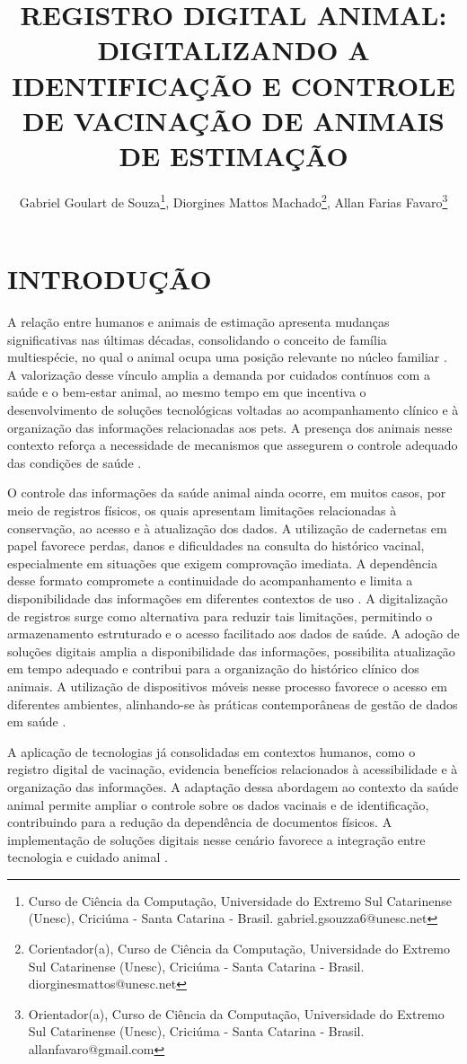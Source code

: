 \documentclass{UNESC}
\title{REGISTRO DIGITAL ANIMAL: DIGITALIZANDO A IDENTIFICAÇÃO E CONTROLE DE VACINAÇÃO DE ANIMAIS DE ESTIMAÇÃO}
\author
{
   Gabriel Goulart de Souza\footnote{Curso de Ciência da Computação, Universidade do Extremo Sul Catarinense (Unesc), Criciúma - Santa Catarina - Brasil. gabriel.gsouzza6@unesc.net},
   Diorgines Mattos Machado\footnote{Corientador(a), Curso de Ciência da Computação, Universidade do Extremo Sul Catarinense (Unesc), Criciúma - Santa Catarina - Brasil. diorginesmattos@unesc.net},
   Allan Farias Favaro\footnote{Orientador(a), Curso de Ciência da Computação, Universidade do Extremo Sul Catarinense (Unesc), Criciúma - Santa Catarina - Brasil. allanfavaro@gmail.com}
}
\begin{document}
\onehalfspacing

\maketitle


\section{INTRODUÇÃO}

A relação entre humanos e animais de estimação apresenta mudanças significativas nas últimas décadas, consolidando o conceito de família multiespécie, no qual o animal ocupa uma posição relevante no núcleo familiar \cite{BOLSON2022}. A valorização desse vínculo amplia a demanda por cuidados contínuos com a saúde e o bem-estar animal, ao mesmo tempo em que incentiva o desenvolvimento de soluções tecnológicas voltadas ao acompanhamento clínico e à organização das informações relacionadas aos pets. A presença dos animais nesse contexto reforça a necessidade de mecanismos que assegurem o controle adequado das condições de saúde \cite{MORAES2024}.

O controle das informações da saúde animal ainda ocorre, em muitos casos, por meio de registros físicos, os quais apresentam limitações relacionadas à conservação, ao acesso e à atualização dos dados. A utilização de cadernetas em papel favorece perdas, danos e dificuldades na consulta do histórico vacinal, especialmente em situações que exigem comprovação imediata. A dependência desse formato compromete a continuidade do acompanhamento e limita a disponibilidade das informações em diferentes contextos de uso \cite{BOLSON2022}. A digitalização de registros surge como alternativa para reduzir tais limitações, permitindo o armazenamento estruturado e o acesso facilitado aos dados de saúde. A adoção de soluções digitais amplia a disponibilidade das informações, possibilita atualização em tempo adequado e contribui para a organização do histórico clínico dos animais. A utilização de dispositivos móveis nesse processo favorece o acesso em diferentes ambientes, alinhando-se às práticas contemporâneas de gestão de dados em saúde \cite{VIEIRA2020}.

A aplicação de tecnologias já consolidadas em contextos humanos, como o registro digital de vacinação, evidencia benefícios relacionados à acessibilidade e à organização das informações. A adaptação dessa abordagem ao contexto da saúde animal permite ampliar o controle sobre os dados vacinais e de identificação, contribuindo para a redução da dependência de documentos físicos. A implementação de soluções digitais nesse cenário favorece a integração entre tecnologia e cuidado animal \cite{MARTINS2024}.
\end{document}
